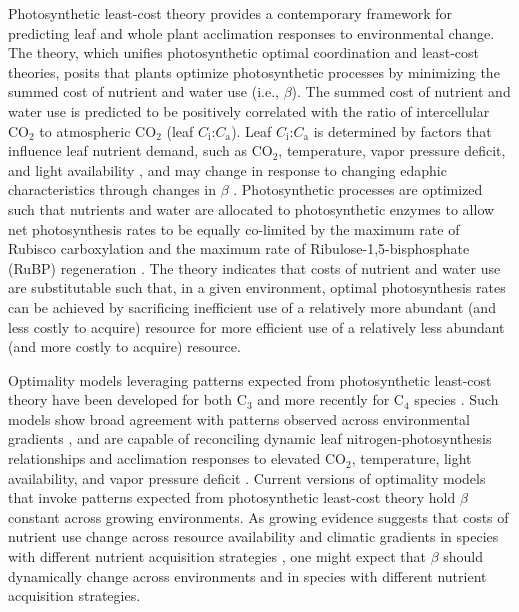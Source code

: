 Photosynthetic least-cost theory  provides a contemporary framework for predicting leaf and whole plant acclimation responses to environmental change. The theory, which unifies photosynthetic optimal coordination  and least-cost  theories, posits that plants optimize photosynthetic processes by minimizing the summed cost of nutrient and water use (i.e., $\beta$). The summed cost of nutrient and water use is predicted to be positively correlated with the ratio of intercellular CO$_2$ to atmospheric CO$_2$ (leaf $C_\mathrm{i}$:$C_\mathrm{a}$). Leaf $C_\mathrm{i}$:$C_\mathrm{a}$ is determined by factors that influence leaf nutrient demand, such as CO$_2$, temperature, vapor pressure deficit, and light availability , and may change in response to changing edaphic characteristics through changes in $\beta$ . Photosynthetic processes are optimized such that nutrients and water are allocated to photosynthetic enzymes to allow net photosynthesis rates to be equally co-limited by the maximum rate of Rubisco carboxylation and the maximum rate of Ribulose-1,5-bisphosphate (RuBP) regeneration . The theory indicates that costs of nutrient and water use are substitutable such that, in a given environment, optimal photosynthesis rates can be achieved by sacrificing inefficient use of a relatively more abundant (and less costly to acquire) resource for more efficient use of a relatively less abundant (and more costly to acquire) resource.

Optimality models leveraging patterns expected from photosynthetic least-cost theory have been developed for both C$_3$  and more recently for C$_4$ species . Such models show broad agreement with patterns observed across environmental gradients , and are capable of reconciling dynamic leaf nitrogen-photosynthesis relationships and acclimation responses to elevated CO$_2$, temperature, light availability, and vapor pressure deficit . Current versions of optimality models that invoke patterns expected from photosynthetic least-cost theory hold $\beta$ constant across growing environments. As growing evidence suggests that costs of nutrient use change across resource availability and climatic gradients in species with different nutrient acquisition strategies , one might expect that $\beta$ should dynamically change across environments and in species with different nutrient acquisition strategies.

